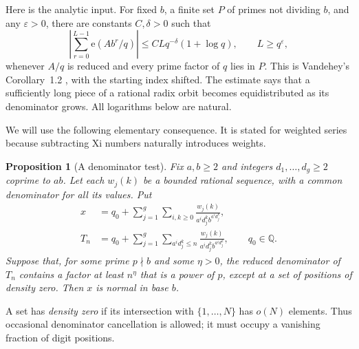 \documentclass[11pt]{article}
\newtheorem{proposition}{Proposition}
\newcommand{\e}{\mathrm e}
\newcommand{\Q}{\mathbb Q}
\begin{document}
Here is the analytic input. For fixed \(b\), a finite set \(P\) of
primes not dividing \(b\), and any \(\varepsilon>0\), there are
constants \(C,\delta>0\) such that
\begin{equation}\label{eq:orbit}
 \left|\sum_{r=0}^{L-1}\e(Ab^r/q)\right|
 \le C L q^{-\delta}(1+\log q),
 \qquad L\ge q^\varepsilon,
\end{equation}
whenever \(A/q\) is reduced and every prime factor of \(q\) lies in
\(P\). This is Vandehey's Corollary~1.2 \cite{Vandehey}, with the
starting index shifted. The estimate says that a sufficiently long
piece of a rational radix orbit becomes equidistributed as its
denominator grows. All logarithms below are natural.

We will use the following elementary consequence. It is stated for
weighted series because subtracting Xi numbers naturally introduces
weights.

\begin{proposition}[A denominator test]\label{prop:transfer}
Fix \(a,b\ge2\) and integers \(d_1,\ldots,d_g\ge2\) coprime to
\(ab\). Let each \(w_j(k)\) be a bounded rational sequence, with a
common denominator for all its values. Put
\begin{align}
 x&=q_0+\sum_{j=1}^g\sum_{i,k\ge0}
       \frac{w_j(k)}{a^i d_j^k b^{a^i d_j^k}},\label{eq:weighted-x}\\
 T_n&=q_0+\sum_{j=1}^g\sum_{a^i d_j^k\le n}
       \frac{w_j(k)}{a^i d_j^k b^{a^i d_j^k}},
       \qquad q_0\in\Q.\label{eq:weighted-truncation}
\end{align}
Suppose that, for some prime \(p\nmid b\) and some \(\eta>0\),
the reduced denominator of \(T_n\) contains a factor at least
\(n^\eta\) that is a power of \(p\), except at a set of positions
of density zero. Then \(x\) is normal in base \(b\).
\end{proposition}

A set has \emph{density zero} if its intersection with
\(\{1,\ldots,N\}\) has \(o(N)\) elements. Thus occasional denominator
cancellation is allowed; it must occupy a vanishing fraction of digit
positions.
\end{document}
